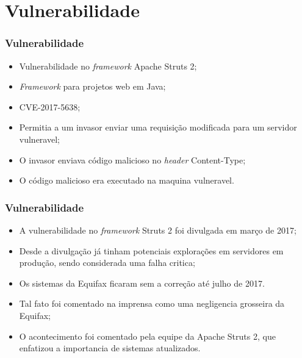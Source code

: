 \documentclass{beamer}
\begin{document}
	\section{Vulnerabilidade}
	\begin{frame}
		\frametitle{Vulnerabilidade}
		\begin{itemize}
			\item Vulnerabilidade no \textit{framework} Apache Struts 2;
			\item \textit{Framework} para projetos web em Java;
			\item CVE-2017-5638;
			\item Permitia a um invasor enviar uma requisição modificada para um servidor vulneravel;
			\item O invasor enviava código malicioso no \textit{header} Content-Type;
			\item O código malicioso era executado na maquina vulneravel.
		\end{itemize}
	\end{frame}
	\begin{frame}
		\frametitle{Vulnerabilidade}
		\begin{itemize}
			\item A vulnerabilidade no \textit{framework} Struts 2 foi divulgada em março de 2017;
			\item Desde a divulgação já tinham potenciais explorações em servidores em produção, sendo considerada uma falha critica;
			\item Os sistemas da Equifax ficaram sem a correção até julho de 2017.
			\item Tal fato foi comentado na imprensa como uma negligencia grosseira da Equifax;
			\item O acontecimento foi comentado pela equipe da Apache Struts 2, que enfatizou a importancia de sistemas atualizados.
		\end{itemize}
	\end{frame}
\end{document}
